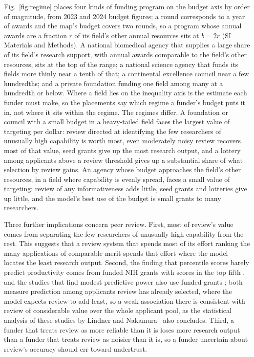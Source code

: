 \documentclass[9pt,twocolumn,twoside]{pnas-new}
\begin{document}
Fig.~\ref{fig:regime} places four kinds of funding program on the budget axis by order of magnitude, from 2023 and 2024 budget figures; a round corresponds to a year of awards and the map's budget covers two rounds, so a program whose annual awards are a fraction $r$ of its field's other annual resources sits at $b = 2r$ (SI Materials and Methods). A national biomedical agency that supplies a large share of its field's research support, with annual awards comparable to the field's other resources, sits at the top of the range; a national science agency that funds its fields more thinly near a tenth of that; a continental excellence council near a few hundredths; and a private foundation funding one field among many at a hundredth or below. Where a field lies on the inequality axis is the estimate each funder must make, so the placements say which regime a funder's budget puts it in, not where it sits within the regime. The regimes differ. A foundation or council with a small budget in a heavy-tailed field faces the largest value of targeting per dollar: review directed at identifying the few researchers of unusually high capability is worth most, even moderately noisy review recovers most of that value, seed grants give up the most research output, and a lottery among applicants above a review threshold gives up a substantial share of what selection by review gains. An agency whose budget approaches the field's other resources, in a field where capability is evenly spread, faces a small value of targeting: review of any informativeness adds little, seed grants and lotteries give up little, and the model's best use of the budget is small grants to many researchers.



Three further implications concern peer review. First, most of review's value comes from separating the few researchers of unusually high capability from the rest. This suggests that a review system that spends most of its effort ranking the many applications of comparable merit spends that effort where the model locates the least research output. Second, the finding that percentile scores barely predict productivity comes from funded NIH grants with scores in the top fifth \citep{Fang2016}, and the studies that find modest predictive power also use funded grants \citep{LiAgha2015}; both measure prediction among applicants review has already selected, where the model expects review to add least, so a weak association there is consistent with review of considerable value over the whole applicant pool, as the statistical analysis of these studies by Lindner and Nakamura~\cite{LindnerNakamura2015} also concludes. Third, a funder that treats review as more reliable than it is loses more research output than a funder that treats review as noisier than it is, so a funder uncertain about review's accuracy should err toward undertrust.
\end{document}
